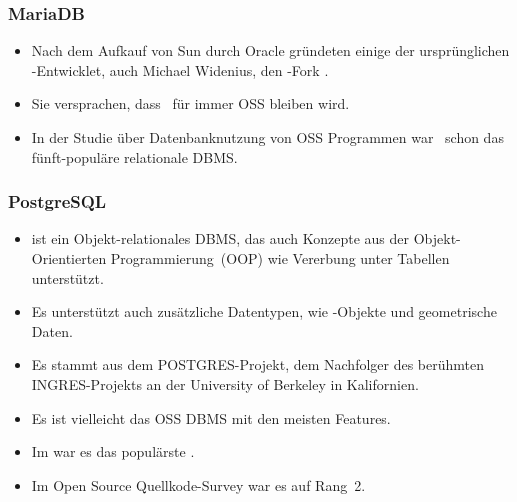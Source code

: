 \documentclass[aspectratio=169,mathserif,notheorems]{beamer}%
\begin{document}
%
\begin{frame}%
\frametitle{MariaDB}%
\begin{itemize}%
\item Nach dem Aufkauf von Sun durch Oracle gründeten einige der ursprünglichen \mysql-Entwicklet, auch Michael Widenius, den \mysql-Fork \mariadb\cite{R2014MM,B2019LTMEELFFSAA,D2015LMAM,AA2018QAWMV1ITSQ,AA2018QAWMV2IDQ}.%
\item<2-> Sie versprachen, dass \mariadb\ für immer OSS bleiben wird.%
\item<3-> In der Studie\cite{PMPVEPWGSMB2025ATAODMSTTHOOSP} über Datenbanknutzung von  OSS Programmen war \mariadb\ schon das fünft-populäre relationale DBMS.%
\end{itemize}%
%
%
\end{frame}%
%
\begin{frame}[t]%
\frametitle{PostgreSQL}%
\begin{itemize}%
\item \postgresql\cite{TA2024DDAMWPAM,FP2023LP,OH2017PUAR,B2024PELUYDW} ist ein Objekt-relationales DBMS, das auch Konzepte aus der Objekt-Orientierten Programmierung~(OOP) wie Vererbung unter Tabellen unterstützt.
\item<2-> Es unterstützt auch zusätzliche Datentypen, wie -Objekte und geometrische Daten.
\item<3-> Es stammt aus dem POSTGRES-Projekt, dem Nachfolger des berühmten INGRES-Projekts an der University of Berkeley in Kalifornien\cite{C20245YOQ}.%
\item<4-> Es ist vielleicht das OSS DBMS mit den meisten Features.%
\item<5-> Im  war es das populärste \cite{SE:SO:2024DS}.
\item<6-> Im Open Source Quellkode-Survey\cite{PMPVEPWGSMB2025ATAODMSTTHOOSP} war es auf Rang~2.
\end{itemize}%
%
%
\end{frame}%
%
\end{document}
